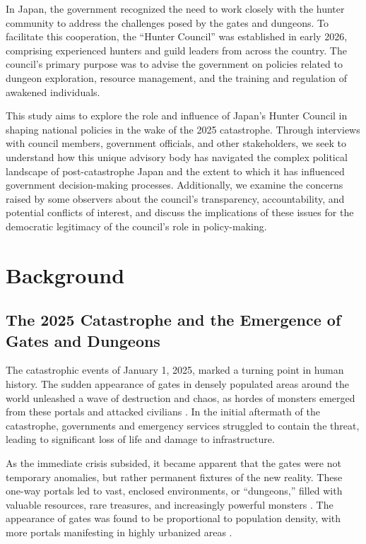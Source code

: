 \documentclass[12pt, a4paper]{article}
\begin{document}
In Japan, the government recognized the need to work closely with the hunter community to address the challenges posed by the gates and dungeons. To facilitate this cooperation, the ``Hunter Council'' was established in early 2026, comprising experienced hunters and guild leaders from across the country. The council's primary purpose was to advise the government on policies related to dungeon exploration, resource management, and the training and regulation of awakened individuals.

This study aims to explore the role and influence of Japan's Hunter Council in shaping national policies in the wake of the 2025 catastrophe. Through interviews with council members, government officials, and other stakeholders, we seek to understand how this unique advisory body has navigated the complex political landscape of post-catastrophe Japan and the extent to which it has influenced government decision-making processes. Additionally, we examine the concerns raised by some observers about the council's transparency, accountability, and potential conflicts of interest, and discuss the implications of these issues for the democratic legitimacy of the council's role in policy-making.

\section{Background}
\subsection{The 2025 Catastrophe and the Emergence of Gates and Dungeons}

The catastrophic events of January 1, 2025, marked a turning point in human history. The sudden appearance of gates in densely populated areas around the world unleashed a wave of destruction and chaos, as hordes of monsters emerged from these portals and attacked civilians \citep{nakano2025spatial, muller2026advancements}. In the initial aftermath of the catastrophe, governments and emergency services struggled to contain the threat, leading to significant loss of life and damage to infrastructure.

As the immediate crisis subsided, it became apparent that the gates were not temporary anomalies, but rather permanent fixtures of the new reality. These one-way portals led to vast, enclosed environments, or ``dungeons,'' filled with valuable resources, rare treasures, and increasingly powerful monsters \citep{yamamoto2026comparative, santos2027behavioral}. The appearance of gates was found to be proportional to population density, with more portals manifesting in highly urbanized areas \citep{nakano2025spatial}.
\end{document}
